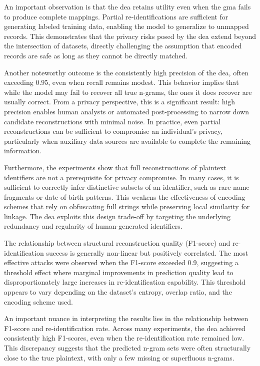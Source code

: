 An important observation is that the \ac{dea} retains utility even when the \ac{gma} fails to produce complete mappings.
Partial re-identifications are sufficient for generating labeled training data, enabling the model to generalize to unmapped records.
This demonstrates that the privacy risks posed by the \ac{dea} extend beyond the intersection of datasets, directly challenging the assumption that encoded records are safe as long as they cannot be directly matched.

Another noteworthy outcome is the consistently high precision of the \ac{dea}, often exceeding 0.95, even when recall remains modest.
This behavior implies that while the model may fail to recover all true n-grams, the ones it does recover are usually correct.
From a privacy perspective, this is a significant result: high precision enables human analysts or automated post-processing to narrow down candidate reconstructions with minimal noise.
In practice, even partial reconstructions can be sufficient to compromise an individual's privacy, particularly when auxiliary data sources are available to complete the remaining information.

Furthermore, the experiments show that full reconstructions of plaintext identifiers are not a prerequisite for privacy compromise.
In many cases, it is sufficient to correctly infer distinctive subsets of an identifier, such as rare name fragments or date-of-birth patterns.
This weakens the effectiveness of encoding schemes that rely on obfuscating full strings while preserving local similarity for linkage.
The \ac{dea} exploits this design trade-off by targeting the underlying redundancy and regularity of human-generated identifiers.

The relationship between structural reconstruction quality (F1-score) and re-identification success is generally non-linear but positively correlated.
The most effective attacks were observed when the F1-score exceeded 0.9, suggesting a threshold effect where marginal improvements in prediction quality lead to disproportionately large increases in re-identification capability.
This threshold appears to vary depending on the dataset's entropy, overlap ratio, and the encoding scheme used.

An important nuance in interpreting the results lies in the relationship between F1-score and re-identification rate.
Across many experiments, the \ac{dea} achieved consistently high F1-scores, even when the re-identification rate remained low.
This discrepancy suggests that the predicted n-gram sets were often structurally close to the true plaintext, with only a few missing or superfluous n-grams.

